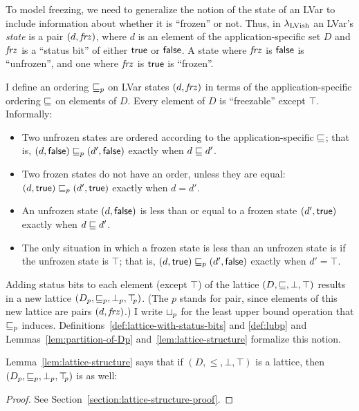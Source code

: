 To model freezing, we need to generalize the notion of the state of an
LVar to include information about whether it is ``frozen'' or not.
Thus, in $\lambda_{\textrm{LVish}}$ an LVar's \emph{state} is a pair
$(d, \mathit{frz})$, where $d$ is an element of the
application-specific set $D$ and $\mathit{frz}$ is a ``status bit'' of
either $\textsf{true}$ or $\textsf{false}$.  A state where $\mathit{frz}$ is
$\textsf{false}$ is ``unfrozen'', and one where $\mathit{frz}$ is
$\textsf{true}$ is ``frozen''.

I define an ordering $\sqsubseteq_p$ on LVar states $(d, \mathit{frz})$ in
terms of the application-specific ordering $\sqsubseteq$ on elements of
$D$.  Every element of $D$ is ``freezable'' except $\top$.
Informally:
\begin{itemize}
\item Two unfrozen states are ordered according to the
  application-specific $\sqsubseteq$; that is, $(d, \textsf{false})
  \sqsubseteq_p (d', \textsf{false})$ exactly when $d \sqsubseteq d'$.
\item Two frozen states do not have an order, unless they are equal:
  $(d, \textsf{true}) \sqsubseteq_p (d', \textsf{true})$ exactly when
  $d = d'$.
\item An unfrozen state $(d, \textsf{false})$ is less than or
  equal to a frozen state $(d', \textsf{true})$ exactly when $d
  \sqsubseteq d'$.
\item The only situation in which a frozen state is less than an
  unfrozen state is if the unfrozen state is $\top$; that is,
  $(d, \textsf{true}) \sqsubseteq_p (d', \textsf{false})$ exactly when
  $d' = \top$.
\end{itemize}
Adding status bits to each element (except $\top$) of the lattice $(D,
\sqsubseteq, \bot, \top)$ results in a new lattice $(D_p, \sqsubseteq_p, \bot_{p},
\top\hspace{-0.85mm}_{p})$.  (The $p$ stands for pair, since elements of this new lattice
are pairs $(d, \mathit{frz})$.) I write $ \sqcup_p $ for the least
upper bound operation that $\sqsubseteq_p$ induces.
Definitions~\ref{def:lattice-with-status-bits} and \ref{def:lubp} and
Lemmas~\ref{lem:partition-of-Dp} and~\ref{lem:lattice-structure}
formalize this notion.

\DefLatticeWithStatusBits

\LemPartitionOfDp

\DefLubP

Lemma~\ref{lem:lattice-structure} says that if $(D, \leq, \bot, \top)$
is a lattice, then $(D_p, \sqsubseteq_p, \bot_{p}, \top\hspace{-0.85mm}_{p})$ is as well:

\LemLatticeStructure
\begin{proof}
See Section~\ref{section:lattice-structure-proof}.
\end{proof}

